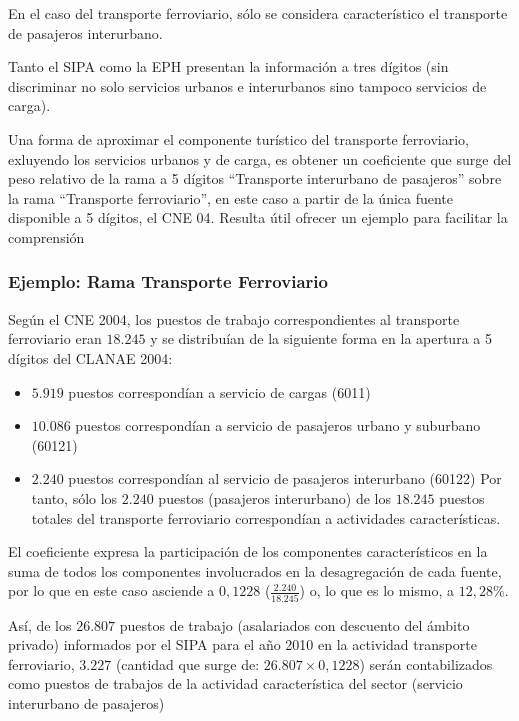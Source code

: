 \documentclass[
  openany]{book}
\providecommand{\tightlist}{%
  \setlength{\itemsep}{0pt}\setlength{\parskip}{0pt}}
\begin{document}
En el caso del transporte ferroviario, sólo se considera característico el transporte de pasajeros interurbano.

Tanto el SIPA como la EPH presentan la información a tres dígitos (sin discriminar no solo servicios urbanos e interurbanos sino tampoco servicios de carga).

Una forma de aproximar el componente turístico del transporte ferroviario, exluyendo los servicios urbanos y de carga, es obtener un coeficiente que surge del peso relativo de la rama a 5 dígitos ``Transporte interurbano de pasajeros'' sobre la rama ``Transporte ferroviario'', en este caso a partir de la única fuente disponible a 5 dígitos, el CNE 04.
Resulta útil ofrecer un ejemplo para facilitar la comprensión

\hypertarget{ejemplo-CNE}{%
\subsubsection{Ejemplo: Rama Transporte Ferroviario}\label{ejemplo-CNE}}

Según el CNE 2004, los puestos de trabajo correspondientes al transporte ferroviario eran \(18.245\) y se distribuían de la siguiente forma en la apertura a 5 dígitos del CLANAE 2004:

\begin{itemize}
\tightlist
\item
  \(5.919\) puestos correspondían a servicio de cargas (6011)
\item
  \(10.086\) puestos correspondían a servicio de pasajeros urbano y suburbano (60121)
\item
  \(2.240\) puestos correspondían al servicio de pasajeros interurbano (60122)
  Por tanto, sólo los \(2.240\) puestos (pasajeros interurbano) de los \(18.245\) puestos totales del transporte ferroviario correspondían a actividades características.
\end{itemize}

El coeficiente expresa la participación de los componentes característicos en la suma de todos los componentes involucrados en la desagregación de cada fuente, por lo que en este caso asciende a \(0,1228\) (\(\frac{2.240}{18.245}\)) o, lo que es lo mismo, a \(12,28\)\%.

Así, de los \(26.807\) puestos de trabajo (asalariados con descuento del ámbito privado) informados por el SIPA para el año 2010 en la actividad transporte ferroviario, \(3.227\) (cantidad que surge de: \(26.807 \times 0,1228\)) serán contabilizados como puestos de trabajos de la actividad característica del sector (servicio interurbano de pasajeros)
\end{document}
